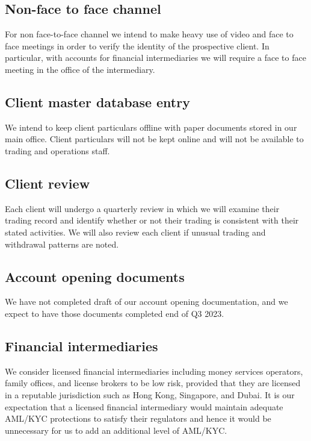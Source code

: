 \subsection{Non-face to face channel}
For non face-to-face channel we intend to make heavy use of video and
face to face meetings in order to verify the identity of the
prospective client.  In particular, with accounts for financial
intermediaries we will require a face to face meeting in the office of
the intermediary.

\subsection{Client master database entry}
We intend to keep client particulars offline with paper documents
stored in our main office.  Client particulars will not be kept online
and will not be available to trading and operations staff.

\subsection{Client review}
Each client will undergo a quarterly review in which we will examine
their trading record and identify whether or not their trading is
consistent with their stated activities.  We will also review each
client if unusual trading and withdrawal patterns are noted.

\subsection{Account opening documents}
We have not completed draft of our account opening documentation, and
we expect to have those documents completed end of Q3 2023.

\subsection{Financial intermediaries}
We consider licensed financial intermediaries including money services
operators, family offices, and license brokers to be low risk,
provided that they are licensed in a reputable jurisdiction such as
Hong Kong, Singapore, and Dubai.  It is our expectation that a
licensed financial intermediary would maintain adequate AML/KYC
protections to satisfy their regulators and hence it would be
unnecessary for us to add an additional level of AML/KYC.

